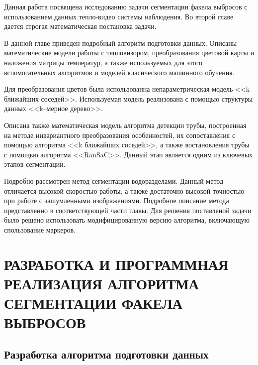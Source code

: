 \documentclass[14pt, a4paper]{extreport}
\begin{document}
	Данная работа посвящена исследованию задачи сегментации факела выбросов с использованием данных тепло-видео системы наблюдения. Во второй главе дается строгая математическая постановка задачи.
	
	В данной главе приведен подробный алгоритм подготовки данных. Описаны математические модели работы с тепловизором, преобразования цветовой карты и наложения матрицы температур, а также используемых для этого вспомогательных алгоритмов и моделей класического машинного обучения.
	
	Для преобразования цветов была использованна непараметрическая модель <<k ближайших соседей>>. Используемая модель реализована с помощью структуры данных <<k--мерное дерево>>.
	
	Описана также математическая модель алгоритма детекции трубы, построенная на методе инвариантного преобразования особенностей, их сопоставления с помощью алгоритма <<k ближайших соседей>>, а также востановления трубы с помощью алгоритма <<RanSaC>>. Данный этап является одним из ключевых этапов сегментации.
	
	Подробно рассмотрен метод сегментации водоразделами. Данный метод отличается высокой скоростью работы, а также достаточно высокой точностью при работе с зашумленными изображениями. Подробное описание метода представленно в соответствующей части главы. Для решения поставленой задачи было решено использовать модифицированную версию алгоритма, включающую спользование маркеров.
	
	
\chapter[\vspace*{-0.22cm}РАЗРАБОТКА И ПРОГРАММНАЯ РЕАЛИЗАЦИЯ АЛГОРИТМА \hspace*{-0.5cm} СЕГМЕНТАЦИИ ФАКЕЛА ВЫБРОСОВ]{\vspace*{-0.22cm}РАЗРАБОТКА И ПРОГРАММНАЯ РЕАЛИЗАЦИЯ АЛГОРИТМА СЕГМЕНТАЦИИ ФАКЕЛА ВЫБРОСОВ}
\section[Разработка алгоритма подготовки данных]{Разработка алгоритма подготовки данных}
	
\end{document}
